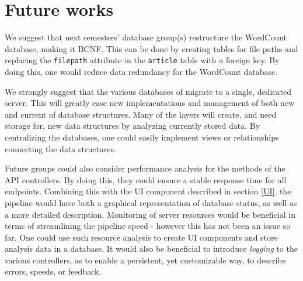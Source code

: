 \section{Future works}
We suggest that next semesters' database group(s) restructure the WordCount database, making it BCNF. 
This can be done by creating tables for file paths and replacing the \texttt{filepath} attribute in the \texttt{article} table with a foreign key.
By doing this, one would reduce data redundancy for the WordCount database. 

We strongly suggest that the various databases of \knox{} migrate to a single, dedicated server.
This will greatly ease new implementations and management of both new and current of database structures.
Many of the layers will create, and need storage for, new data structures by analyzing currently stored data.
By centralizing the \knox{} databases, one could easily implement views or relationships connecting the data structures.

Future groups could also consider performance analysis for the methods of the API controllers. 
By doing this, they could ensure a stable response time for all endpoints.
Combining this with the UI component described in section \ref{UI}, the pipeline would have both a graphical representation of database status, as well as a more detailed description.
Monitoring of server resources would be beneficial in terms of streamlining the pipeline speed - however this has not been an issue so far.
One could use such resource analysis to create UI components and store analysis data in a database. 
It would also be beneficial to introduce \textit{logging}\cite{ASPLogging} to the various controllers, as to enable a persistent, yet customizable way, to describe errors, speeds, or feedback.
